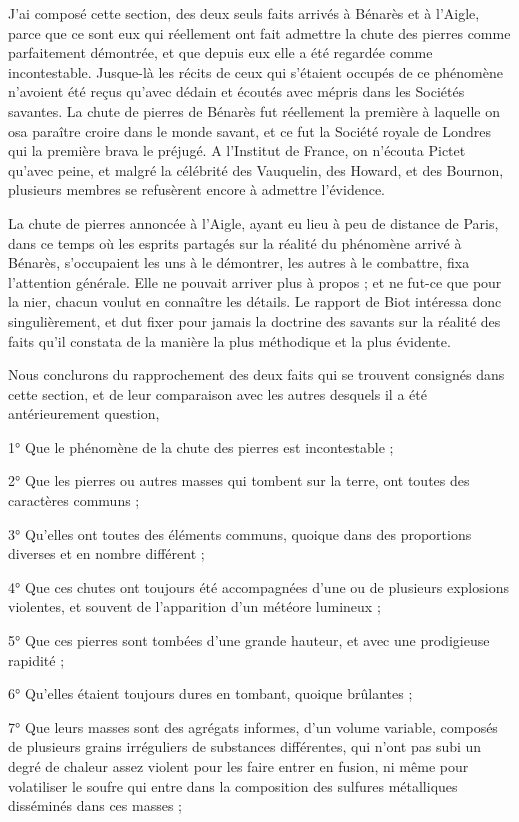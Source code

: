 \documentclass[a4paper, 12pt, oneside, french]{article}
\begin{document}
J'ai composé cette section, des deux seuls faits arrivés à Bénarès et à l'Aigle, parce que ce sont eux qui réellement ont fait admettre la chute des pierres comme parfaitement démontrée, et que depuis eux elle a été regardée comme incontestable. Jusque-là les récits de ceux qui s'étaient occupés de ce phénomène n'avoient été reçus qu'avec dédain et écoutés avec mépris dans les Sociétés savantes. La chute de pierres de Bénarès fut réellement la première à laquelle on osa paraître croire dans le monde savant, et ce fut la Société royale de Londres qui la première brava le préjugé. A l'Institut de France, on n'écouta Pictet qu'avec peine, et malgré la célébrité des Vauquelin, des Howard, et des Bournon, plusieurs membres se refusèrent encore à admettre l'évidence.

La chute de pierres annoncée à l'Aigle, ayant eu lieu à peu de distance de Paris, dans ce temps où les esprits partagés sur la réalité du phénomène arrivé à Bénarès, s'occupaient les uns à le démontrer, les autres à le combattre, fixa l'attention générale. Elle ne pouvait arriver plus à propos ; et ne fut-ce que pour la nier, chacun voulut en connaître les détails. Le rapport de Biot intéressa donc singulièrement, et dut fixer pour jamais la doctrine des savants sur la réalité des faits qu'il constata de la manière la plus méthodique et la plus évidente.

Nous conclurons du rapprochement des deux faits qui se trouvent consignés dans cette section, et de leur comparaison avec les autres desquels il a été antérieurement question,

1° Que le phénomène de la chute des pierres est incontestable ;

2° Que les pierres ou autres masses qui tombent sur la terre, ont toutes des caractères communs ;

3° Qu'elles ont toutes des éléments communs, quoique dans des proportions diverses et en nombre différent ;

4° Que ces chutes ont toujours été accompagnées d'une ou de plusieurs explosions violentes, et souvent de l'apparition d'un météore lumineux ;

5° Que ces pierres sont tombées d'une grande hauteur, et avec une prodigieuse rapidité ;

6° Qu'elles étaient toujours dures en tombant, quoique brûlantes ;

7° Que leurs masses sont des agrégats informes, d'un volume variable, composés de plusieurs grains irréguliers de substances différentes, qui n'ont pas subi un degré de chaleur assez violent pour les faire entrer en fusion, ni même pour volatiliser le soufre qui entre dans la composition des sulfures métalliques disséminés dans ces masses ;
\end{document}
